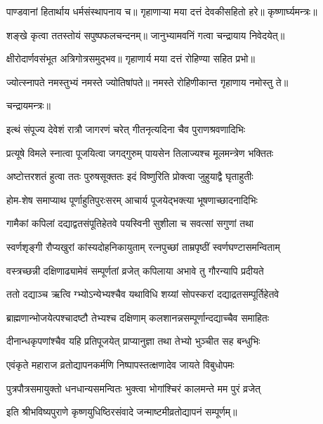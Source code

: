 पाण्डवानां हितार्थाय धर्मसंस्थापनाय च॥
गृहाणाऱ्या मया दत्तं देवकीसहितो हरे॥
कृष्णार्घ्यमन्त्रः॥

शङ्खे कृत्वा ततस्तोयं सपुष्पफलचन्दनम्॥
जानुभ्यामवनिं गत्वा चन्द्रायाय निवेदयेत्॥

क्षीरोदार्णवसंभूत अत्रिगोत्रसमुद्भव॥
गृहाणार्य मया दत्तं रोहिण्या सहित प्रभो॥

ज्योत्स्नापते नमस्तुभ्यं नमस्ते ज्योतिषांपते॥
नमस्ते रोहिणीकान्त गृहाणाय नमोस्तु ते॥

चन्द्रायमन्त्रः॥

\twolineshloka
{इत्थं संपूज्य देवेशं रात्रौ जागरणं चरेत्}
{गीतनृत्यदिना चैव पुराणश्रवणादिभिः}

\twolineshloka
{प्रत्यूषे विमले स्नात्वा पूजयित्वा जगद्गुरुम्}
{पायसेन तिलाज्यश्च मूलमन्त्रेण भक्तितः}

\twolineshloka
{अष्टोत्तरशतं हुत्वा ततः पुरुषसूक्ततः}
{इदं विष्णुरिति प्रोक्त्वा जुहुयाद्वै घृताहुतीः}

\twolineshloka
{होम-शेष समाप्याथ पूर्णाहुतिपुरःसरम्}
{आचार्य पूजयेद्भक्त्या भूषणाच्छादनादिभिः}

\twolineshloka
{गामैकां कपिलां दद्याद्वतसंपूतिहेतवे}
{पयस्विनी सुशीला च सवत्सां सगुणां तथा}

\twolineshloka
{स्वर्णशृङ्गी रौप्यखुरां कांस्यदोहनिकायुताम्}
{रत्नपुच्छां ताम्रपृष्ठीं स्वर्णघण्टासमन्विताम्}

\twolineshloka
{वस्त्रच्छन्नी दक्षिणाढ्यामेवं सम्पूर्णतां व्रजेत्}
{कपिलाया अभावे तु गौरन्यापि प्रदीयते}

\twolineshloka
{ततो दद्याञ्च ऋत्वि ग्भ्योऽन्येभ्यश्चैव यथाविधि}
{शय्यां सोपस्करां दद्याद्रतसम्पूर्तिहेतवे}

\twolineshloka
{ब्राह्मणान्भोजयेत्पश्चादष्टौ तेभ्यश्च दक्षिणाम्}
{कलशानन्नसम्पूर्णान्दद्याच्चैव समाहितः}

\twolineshloka
{दीनान्धकृपणांश्चैव यहि प्रतिपूजयेत्}
{प्राप्यानुज्ञा तथा तेभ्यो भुञ्चीत सह बन्धुभिः}

\twolineshloka
{एवंकृते महाराज व्रतोद्यापनकर्मणि}
{निष्पापस्तत्क्षणादेव जायते विबुधोपमः}

\twolineshloka
{पुत्रपौत्रसमायुक्तो धनधान्यसमन्वितः}
{भुक्त्वा भोगांश्चिरं कालमन्ते मम पुरं व्रजेत्}

इति श्रीभविष्यपुराणे कृष्णयुधिष्ठिरसंवादे जन्माष्टमीव्रतोद्यापनं सम्पूर्णम्॥
